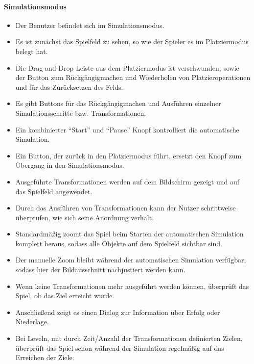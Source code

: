 \paragraph{Simulationsmodus}
\begin{itemize}
\item Der Benutzer befindet sich im Simulationsmodus.
\item Es ist zunächst das Spielfeld zu sehen, so wie der Spieler es im Platziermodus belegt hat.
\item Die Drag-and-Drop Leiste aus dem Platziermodus ist verschwunden, sowie der 
Button zum Rückgängigmachen und Wiederholen von 
Platzieroperationen und für das Zurücksetzen des Felds.
\item Es gibt Buttons für das Rückgängigmachen und Ausführen 
einzelner Simulationsschritte bzw. Transformationen.
\item Ein kombinierter "`Start"' und "`Pause"' Knopf kontrolliert die automatische Simulation.
\item Ein Button, der zurück in den Platziermodus führt, ersetzt den Knopf zum Übergang 
in den Simulationsmodus.
\item Ausgeführte Transformationen werden auf dem Bildschirm gezeigt und auf das Spielfeld angewendet.
\item Durch das Ausführen von Transformationen kann der Nutzer schrittweise
überprüfen, wie sich seine Anordnung verhält.
\item Standardmäßig zoomt das Spiel beim Starten der automatischen Simulation komplett heraus, sodass alle Objekte auf dem Spielfeld sichtbar sind.
\item Der manuelle Zoom bleibt während der automatischen Simulation verfügbar, sodass hier der Bildausschnitt nachjustiert werden kann.
\item Wenn keine Transformationen mehr ausgeführt werden können, überprüft das Spiel, ob das Ziel erreicht
wurde.
\item Anschließend zeigt es einen Dialog zur Information über Erfolg oder Niederlage.
\item Bei Leveln, mit durch Zeit/Anzahl der Transformationen definierten Zielen,
überprüft das Spiel schon während der Simulation regelmäßig auf das Erreichen
der Ziele.
\end{itemize}

